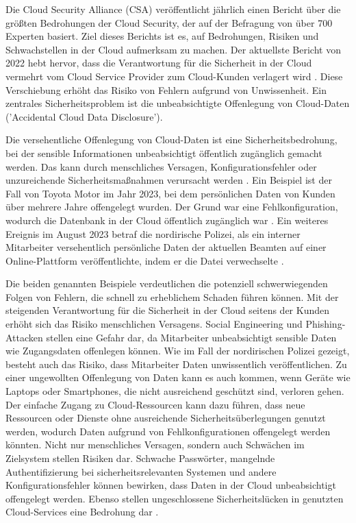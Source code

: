 Die Cloud Security Alliance (CSA) veröffentlicht jährlich einen Bericht über die größten Bedrohungen der Cloud Security, der auf der Befragung von über 700 Experten basiert. Ziel dieses Berichts ist es, auf Bedrohungen, Risiken und Schwachstellen in der Cloud aufmerksam zu machen. Der aktuellste Bericht von 2022 hebt hervor, dass die Verantwortung für die Sicherheit in der Cloud vermehrt vom Cloud Service Provider zum Cloud-Kunden verlagert wird \cite{CloudSecurityAlliance.2022}. %
Diese Verschiebung erhöht das Risiko von Fehlern aufgrund von Unwissenheit. Ein zentrales Sicherheitsproblem ist die unbeabsichtigte Offenlegung von Cloud-Daten ('Accidental Cloud Data Disclosure').

Die versehentliche Offenlegung von Cloud-Daten ist eine Sicherheitsbedrohung, bei der sensible Informationen unbeabsichtigt öffentlich zugänglich gemacht werden. Das kann durch menschliches Versagen, Konfigurationsfehler oder unzureichende Sicherheitsmaßnahmen verursacht werden \cite{CloudSecurityAlliance.2022}. %
Ein Beispiel ist der Fall von Toyota Motor im Jahr 2023, bei dem persönlichen Daten von Kunden über mehrere Jahre offengelegt wurden. Der Grund war eine Fehlkonfiguration, wodurch die Datenbank in der Cloud öffentlich zugänglich war \cite{Whittaker.2023}.
Ein weiteres Ereignis im August 2023 betraf die nordirische Polizei, als ein interner Mitarbeiter versehentlich persönliche Daten der aktuellen Beamten auf einer Online-Plattform veröffentlichte, indem er die Datei verwechselte \cite{PSNI.2023}.

Die beiden genannten Beispiele verdeutlichen die potenziell schwerwiegenden Folgen von Fehlern, die schnell zu erheblichem Schaden führen können. Mit der steigenden Verantwortung für die Sicherheit in der Cloud seitens der Kunden erhöht sich das Risiko menschlichen Versagens. Social Engineering und Phishing-Attacken stellen eine Gefahr dar, da Mitarbeiter unbeabsichtigt sensible Daten wie Zugangsdaten offenlegen können. Wie im Fall der nordirischen Polizei gezeigt, besteht auch das Risiko, dass Mitarbeiter Daten unwissentlich veröffentlichen. Zu einer ungewollten Offenlegung von Daten kann es auch kommen, wenn Geräte wie Laptops oder Smartphones, die nicht ausreichend geschützt sind, verloren gehen. Der einfache Zugang zu Cloud-Ressourcen kann dazu führen, dass neue Ressourcen oder Dienste ohne ausreichende Sicherheitsüberlegungen genutzt werden, wodurch Daten aufgrund von Fehlkonfigurationen offengelegt werden könnten. Nicht nur menschliches Versagen, sondern auch Schwächen im Zielsystem stellen Risiken dar. Schwache Passwörter, mangelnde Authentifizierung bei sicherheitsrelevanten Systemen und andere Konfigurationsfehler können bewirken, dass Daten in der Cloud unbeabsichtigt offengelegt werden. Ebenso stellen ungeschlossene Sicherheitslücken in genutzten Cloud-Services eine Bedrohung dar \cite{Trabelsi.2019}\cite{Brindha.2015}.

